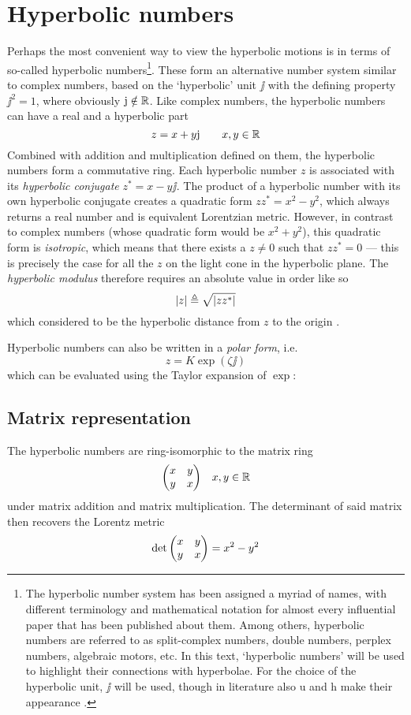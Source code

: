 \section{Hyperbolic numbers}
Perhaps the most convenient way to view the hyperbolic motions is in terms of so-called hyperbolic numbers\footnote{The hyperbolic number system has been assigned a myriad of names, with different terminology and mathematical notation for almost every influential paper that has been published about them. Among others, hyperbolic numbers are referred to as split-complex numbers, double numbers, perplex numbers, algebraic motors, etc. In this text, `hyperbolic numbers' will be used to highlight their connections with hyperbolae. For the choice of the hyperbolic unit, $\jj$ will be used, though in literature also $\mathrm{u}$ and $\mathrm{h}$ make their appearance \cite{Fjelstad1986, Sobczyk1995, Motter1998, Harkin2004}.}. These form an alternative number system similar to complex numbers, based on the `hyperbolic' unit $\jj$ with the defining property $\jj^2 = 1$, where obviously $\mathrm{j} \notin \mathbb{R}$. Like complex numbers, the hyperbolic numbers can have a real and a hyperbolic part
$$ z = x + y\mathrm{j} \qquad x, y \in \mathbb{R}$$
Combined with addition and multiplication defined on them, the hyperbolic numbers form a commutative ring. Each hyperbolic number $z$ is associated with its \emph{hyperbolic conjugate} $z^* = x - y\jj$. The product of a hyperbolic number with its own hyperbolic conjugate creates a quadratic form $zz^* = x^2 - y^2$, which always returns a real number and is equivalent Lorentzian metric. However, in contrast to complex numbers (whose quadratic form would be $x^2 + y^2$), this quadratic form is \emph{isotropic}, which means that there exists a $z \neq 0$ such that $zz^* = 0$ --- this is precisely the case for all the $z$ on the light cone in the hyperbolic plane. The \emph{hyperbolic modulus} therefore requires an absolute value in order like so
$$ \abs{z} \triangleq \sqrt{\abs{zz^*}}$$
which considered to be the hyperbolic distance from $z$ to the origin \cite{Sobczyk1995}.

Hyperbolic numbers can also be written in a \emph{polar form}, i.e.
$$z = K \exp(\zeta \jj)$$
which can be evaluated using the Taylor expansion of $\exp$:
\subsection{Matrix representation}
The hyperbolic numbers are ring-isomorphic to the matrix ring
$$ \mqty(x & y \\ y & x) \quad x, y \in \real$$
under matrix addition and matrix multiplication. The determinant of said matrix then recovers the Lorentz metric
$$ \det \mqty(x & y \\ y & x) = x^2 - y^2$$